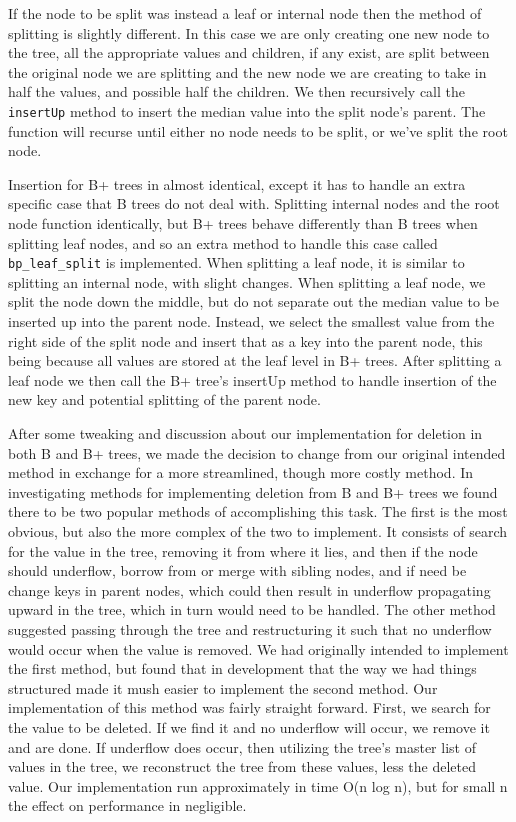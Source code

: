 If the node to be split was instead a leaf or internal node then the
method of splitting is slightly different.  In this case we are only
creating one new node to the tree, all the appropriate values and
children, if any exist, are split between the original node we are
splitting and the new node we are creating to take in half the values,
and possible half the children.  We then recursively call the
\texttt{insertUp} method to insert the median value into the split
node's parent.  The function will recurse until either no node needs
to be split, or we've split the root node.

Insertion for B+ trees in almost identical, except it has to handle an
extra specific case that B trees do not deal with.  Splitting internal
nodes and the root node function identically, but B+ trees behave
differently than B trees when splitting leaf nodes, and so an extra
method to handle this case called \texttt{bp\_leaf\_split} is
implemented.  When splitting a leaf node, it is similar to splitting
an internal node, with slight changes.  When splitting a leaf node, we
split the node down the middle, but do not separate out the median
value to be inserted up into the parent node.  Instead, we select the
smallest value from the right side of the split node and insert that
as a key into the parent node, this being because all values are
stored at the leaf level in B+ trees.  After splitting a leaf node we
then call the B+ tree's insertUp method to handle insertion of the new
key and potential splitting of the parent node.

After some tweaking and discussion about our implementation for
deletion in both B and B+ trees, we made the decision to change from
our original intended method in exchange for a more streamlined,
though more costly method.  In investigating methods for implementing
deletion from B and B+ trees we found there to be two popular methods
of accomplishing this task.  The first is the most obvious, but also
the more complex of the two to implement.  It consists of search for
the value in the tree, removing it from where it lies, and then if the
node should underflow, borrow from or merge with sibling nodes, and if
need be change keys in parent nodes, which could then result in
underflow propagating upward in the tree, which in turn would need to
be handled.  The other method suggested passing through the tree and
restructuring it such that no underflow would occur when the value is
removed.  We had originally intended to implement the first method,
but found that in development that the way we had things structured
made it mush easier to implement the second method.  Our
implementation of this method was fairly straight forward. First, we search
for the value to be deleted. If we find it and no underflow will
occur, we remove it and are done.  If underflow does occur, then
utilizing the tree's master list of values in the tree, we reconstruct
the tree from these values, less the deleted value.  Our
implementation run approximately in time O(n log n), but for small n
the effect on performance in negligible.

